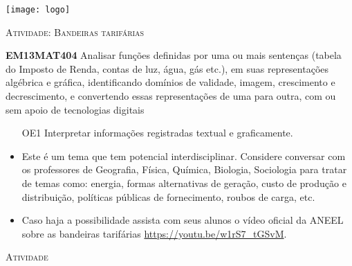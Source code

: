 \documentclass[10 pt,usenames,dvipsnames, oneside]{article}
\begin{document}
\begin{center}
  \begin{minipage}[l]{3cm}
\texttt{[image: logo]}    
\end{minipage}\hfill
\begin{minipage}[r]{.8\textwidth}
 {\Large \scshape Atividade: Bandeiras tarifárias}  
\end{minipage}
\end{center}
\vspace{.2cm}

\ifdefined\prof
\begin{objetivos}
\item \textbf{EM13MAT404} Analisar funções definidas por uma ou mais sentenças (tabela do Imposto de Renda, contas de luz, água, gás etc.), em suas representações algébrica e gráfica, identificando domínios de validade, imagem, crescimento e decrescimento, e convertendo essas representações de uma para outra, com ou sem apoio de tecnologias digitais
\end{objetivos}

\begin{goals}

\begin{enumerate}

\item[OE1] Interpretar informações registradas textual e graficamente.

\end{enumerate}

\tcblower

\begin{itemize}
\item Este é um tema que tem potencial interdisciplinar. Considere conversar com os professores de Geografia, Física, Química, Biologia, Sociologia para tratar de temas como: energia, formas alternativas de geração, custo de produção e distribuição, políticas públicas de fornecimento, roubos de carga, etc.

\item Caso haja a possibilidade assista com seus alunos o vídeo oficial da ANEEL sobre as bandeiras tarifárias \url{https://youtu.be/w1rS7_tGSvM}.
\end{itemize}

\end{goals}

\bigskip
\begin{center}
{\large \scshape Atividade}
\end{center}
\fi
\end{document}
